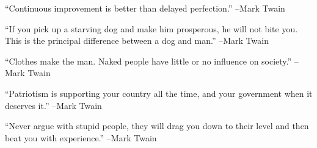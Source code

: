 \documentclass{article}%
\begin{document}
\linebreak%
\vspace{1mm}%
\begin{minipage}{\textwidth}%
\flushleft%
“Continuous improvement is better than delayed perfection.”%
\linebreak%
\vspace{1mm}%
–Mark Twain%
\linebreak%
\vspace{1mm}%
\end{minipage}%
\linebreak%
\vspace{1mm}%
\begin{minipage}{\textwidth}%
\flushleft%
“If you pick up a starving dog and make him prosperous, he will not bite you. This is the principal difference between a dog and man.”%
\linebreak%
\vspace{1mm}%
–Mark Twain%
\linebreak%
\vspace{1mm}%
\end{minipage}%
\linebreak%
\vspace{1mm}%
\begin{minipage}{\textwidth}%
\flushleft%
“Clothes make the man. Naked people have little or no influence on society.”%
\linebreak%
\vspace{1mm}%
–Mark Twain%
\linebreak%
\vspace{1mm}%
\end{minipage}%
\linebreak%
\vspace{1mm}%
\begin{minipage}{\textwidth}%
\flushleft%
“Patriotism is supporting your country all the time, and your government when it deserves it.”%
\linebreak%
\vspace{1mm}%
–Mark Twain%
\linebreak%
\vspace{1mm}%
\end{minipage}%
\linebreak%
\vspace{1mm}%
\begin{minipage}{\textwidth}%
\flushleft%
“Never argue with stupid people, they will drag you down to their level and then beat you with experience.”%
\linebreak%
\vspace{1mm}%
–Mark Twain%
\linebreak%
\vspace{1mm}%
\end{minipage}%
\end{document}
